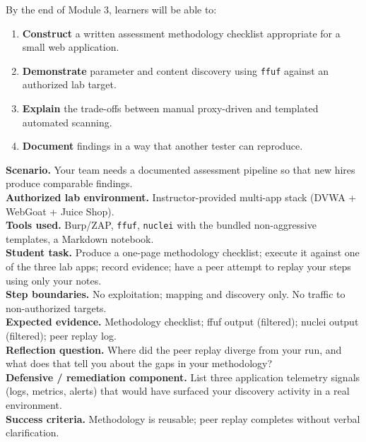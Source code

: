 \documentclass[11pt,letterpaper,oneside]{report}
\newcommand{\tool}[1]{\texttt{\small #1}}
\begin{document}
\begin{outcomes}
By the end of Module 3, learners will be able to:
\begin{enumerate}
  \item \textbf{Construct} a written assessment methodology checklist appropriate for a small web application.
  \item \textbf{Demonstrate} parameter and content discovery using \tool{ffuf} against an authorized lab target.
  \item \textbf{Explain} the trade-offs between manual proxy-driven and templated automated scanning.
  \item \textbf{Document} findings in a way that another tester can reproduce.
\end{enumerate}
\end{outcomes}

\begin{labbox}
\textbf{Scenario.} Your team needs a documented assessment pipeline so that new hires produce comparable findings.\\[3pt]
\textbf{Authorized lab environment.} Instructor-provided multi-app stack (DVWA + WebGoat + Juice Shop).\\[3pt]
\textbf{Tools used.} Burp/ZAP, \tool{ffuf}, \tool{nuclei} with the bundled non-aggressive templates, a Markdown notebook.\\[3pt]
\textbf{Student task.} Produce a one-page methodology checklist; execute it against one of the three lab apps; record evidence; have a peer attempt to replay your steps using only your notes.\\[3pt]
\textbf{Step boundaries.} No exploitation; mapping and discovery only. No traffic to non-authorized targets.\\[3pt]
\textbf{Expected evidence.} Methodology checklist; ffuf output (filtered); nuclei output (filtered); peer replay log.\\[3pt]
\textbf{Reflection question.} Where did the peer replay diverge from your run, and what does that tell you about the gaps in your methodology?\\[3pt]
\textbf{Defensive / remediation component.} List three application telemetry signals (logs, metrics, alerts) that would have surfaced your discovery activity in a real environment.\\[3pt]
\textbf{Success criteria.} Methodology is reusable; peer replay completes without verbal clarification.
\end{labbox}
\end{document}
